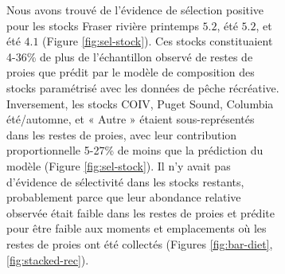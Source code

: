\begin{figure}[H]
\begin{figure}[H]
Nous avons trouvé de l'évidence de sélection positive pour les stocks Fraser rivière printemps $5.2$, été $5.2$, et été $4.1$ (Figure \ref{fig:sel-stock}). Ces stocks constituaient 4-36\% de plus de l'échantillon observé de restes de proies que prédit par le modèle de composition des stocks paramétrisé avec les données de pêche récréative. Inversement, les stocks COIV, Puget Sound, Columbia été/automne, et « Autre » étaient sous-représentés dans les restes de proies, avec leur contribution proportionnelle 5-27\% de moins que la prédiction du modèle (Figure \ref{fig:sel-stock}). Il n'y avait pas d'évidence de sélectivité dans les stocks restants, probablement parce que leur abondance relative observée était faible dans les restes de proies et prédite pour être faible aux moments et emplacements où les restes de proies ont été collectés (Figures \ref{fig:bar-diet}, \ref{fig:stacked-rec}).


\end{figure}
\end{figure}
